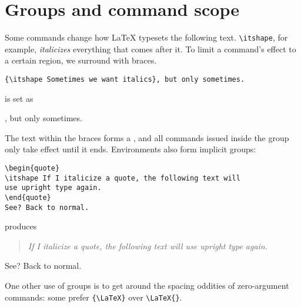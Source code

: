 \section{Groups and command scope}
Some commands change how \LaTeX{} typesets the following text.
\verb|\itshape|, for example, \textit{italicizes} everything that comes after it.
To limit a command's effect to a certain region, we surround with braces.
\begin{leftfigure}
\begin{lstlisting}
{\itshape Sometimes we want italics}, but only sometimes.
\end{lstlisting}
\end{leftfigure}
is set as
\begin{leftfigure}
, but only sometimes.
\end{leftfigure}
The text within the braces forms a ,
and all commands issued inside the group only take effect until it ends.
Environments also form implicit groups:
\begin{leftfigure}
\begin{lstlisting}
\begin{quote}
\itshape If I italicize a quote, the following text will
use upright type again.
\end{quote}
See? Back to normal.
\end{lstlisting}
\end{leftfigure}
produces
\begin{leftfigure}
\lm
\begin{quote}
\itshape If I italicize a quote, the following text will
use upright type again.
\end{quote}
See? Back to normal.
\end{leftfigure}
One other use of groups is to get around the spacing oddities of zero-argument
commands: some prefer \verb|{\LaTeX}| over \verb|\LaTeX{}|.

